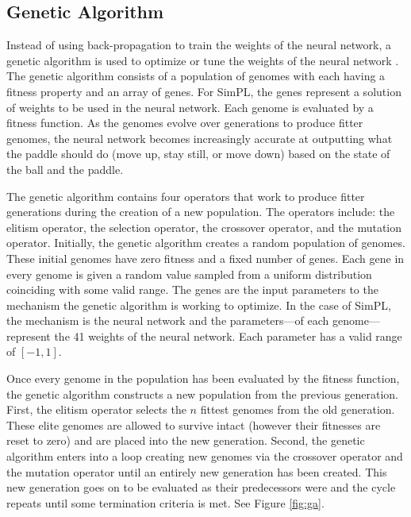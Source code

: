 \documentclass[a4paper,10pt]{article}
\begin{document}
\pagebreak

\subsection{Genetic Algorithm}

Instead of using back-propagation to train the weights of the neural network, a genetic algorithm is used to optimize or tune the weights of the neural network \cite{neuralnetworks}. The genetic algorithm consists of a population of genomes with each having a fitness property and an array of genes. For SimPL, the genes represent a solution of weights to be used in the neural network. Each genome is evaluated by a fitness function. As the genomes evolve over generations to produce fitter genomes, the neural network becomes increasingly accurate at outputting what the paddle should do (move up, stay still, or move down) based on the state of the ball and the paddle. 

The genetic algorithm contains four operators that work to produce fitter generations during the creation of a new population. The operators include: the elitism operator, the selection operator, the crossover operator, and the mutation operator. Initially, the genetic algorithm creates a random population of genomes. These initial genomes have zero fitness and a fixed number of genes. Each gene in every genome is given a random value sampled from a uniform distribution coinciding with some valid range. The genes are the input parameters to the mechanism the genetic algorithm is working to optimize. In the case of SimPL, the mechanism is the neural network and the parameters---of each genome---represent the 41 weights of the neural network. Each parameter has a valid range of $[-1,1]$. 

Once every genome in the population has been evaluated by the fitness function, the genetic algorithm constructs a new population from the previous generation. First, the elitism operator selects the $n$ fittest genomes from the old generation. These elite genomes are allowed to survive intact (however their fitnesses are reset to zero) and are placed into the new generation. Second, the genetic algorithm enters into a loop creating new genomes via the crossover operator and the mutation operator until an entirely new generation has been created. This new generation goes on to be evaluated as their predecessors were and the cycle repeats until some termination criteria is met. See Figure \ref{fig:ga}.
\end{document}
